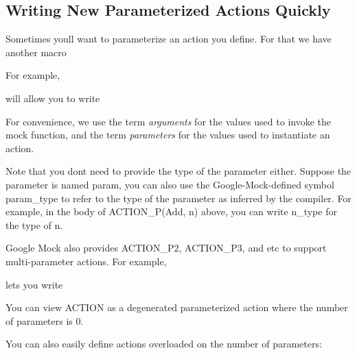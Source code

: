\subsection*{Writing New Parameterized Actions Quickly}

Sometimes you\textquotesingle{}ll want to parameterize an action you define. For that we have another macro 
\begin{DoxyCode}{0}
\end{DoxyCode}


For example, 
\begin{DoxyCode}{0}
\end{DoxyCode}
 will allow you to write 
\begin{DoxyCode}{0}
\end{DoxyCode}


For convenience, we use the term {\itshape arguments} for the values used to invoke the mock function, and the term {\itshape parameters} for the values used to instantiate an action.

Note that you don\textquotesingle{}t need to provide the type of the parameter either. Suppose the parameter is named {\ttfamily param}, you can also use the Google-\/Mock-\/defined symbol {\ttfamily param\+\_\+type} to refer to the type of the parameter as inferred by the compiler. For example, in the body of {\ttfamily A\+C\+T\+I\+O\+N\+\_\+\+P(\+Add, n)} above, you can write {\ttfamily n\+\_\+type} for the type of {\ttfamily n}.

Google Mock also provides {\ttfamily A\+C\+T\+I\+O\+N\+\_\+\+P2}, {\ttfamily A\+C\+T\+I\+O\+N\+\_\+\+P3}, and etc to support multi-\/parameter actions. For example, 
\begin{DoxyCode}{0}
\DoxyCodeLine{\}}
\end{DoxyCode}
 lets you write 
\begin{DoxyCode}{0}
\end{DoxyCode}


You can view {\ttfamily A\+C\+T\+I\+ON} as a degenerated parameterized action where the number of parameters is 0.

You can also easily define actions overloaded on the number of parameters\+: 
\begin{DoxyCode}{0}
\end{DoxyCode}


